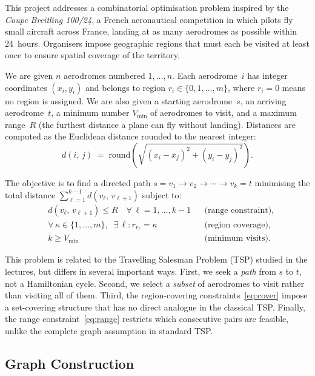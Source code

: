 \documentclass[12pt, a4paper]{article}
\newcommand{\dist}[2]{d(#1,\,#2)}
\begin{document}
This project addresses a combinatorial optimisation problem inspired by the
\textit{Coupe Breitling 100/24}, a French aeronautical competition in which pilots
fly small aircraft across France, landing at as many aerodromes as possible within
24~hours. Organisers impose geographic regions that must each be visited at least once
to ensure spatial coverage of the territory.

We are given $n$ aerodromes numbered $1,\ldots,n$. Each aerodrome~$i$ has integer
coordinates $(x_i, y_i)$ and belongs to region $r_i \in \{0,1,\ldots,m\}$, where
$r_i = 0$ means no region is assigned. We are also given a starting aerodrome~$s$,
an arriving aerodrome~$t$, a minimum number $V_{\min}$ of aerodromes to visit, and a
maximum range~$R$ (the furthest distance a plane can fly without landing).
Distances are computed as the Euclidean distance rounded to the nearest integer:
\[
  \dist{i}{j} \;=\; \mathrm{round}\!\left(\sqrt{(x_i - x_j)^2 + (y_i - y_j)^2}\right).
\]

The objective is to find a directed path $s = v_1 \to v_2 \to \cdots \to v_k = t$
minimising the total distance $\sum_{\ell=1}^{k-1} \dist{v_\ell}{v_{\ell+1}}$
subject to:
\begin{align}
  &\dist{v_\ell}{v_{\ell+1}} \leq R
    \quad \forall\,\ell = 1,\ldots,k{-}1
    && \text{(range constraint)}, \label{eq:range}\\[2pt]
  &\forall\,\kappa \in \{1,\ldots,m\},\;\;
    \exists\,\ell : r_{v_\ell} = \kappa
    && \text{(region coverage)}, \label{eq:cover}\\[2pt]
  &k \geq V_{\min}
    && \text{(minimum visits)}. \label{eq:card}
\end{align}

This problem is related to the Travelling Salesman Problem (TSP) studied in the
lectures, but differs in several important ways. First, we seek a \emph{path} from $s$
to $t$, not a Hamiltonian cycle. Second, we select a \emph{subset} of aerodromes to
visit rather than visiting all of them. Third, the region-covering
constraints~\eqref{eq:cover} impose a set-covering structure that has no direct
analogue in the classical TSP. Finally, the range constraint~\eqref{eq:range}
restricts which consecutive pairs are feasible, unlike the complete graph assumption
in standard TSP.

\subsection{Graph Construction}
\end{document}
